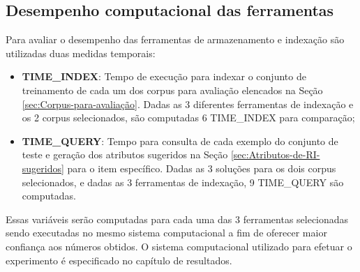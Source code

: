     \subsection{Desempenho computacional das ferramentas}  \label{subsec:Desempenho-computacional}
        Para avaliar o desempenho das ferramentas de armazenamento e indexação são utilizadas duas medidas temporais:
        \begin{itemize}
            \item \textbf{TIME\_INDEX}: Tempo de execução para indexar o conjunto de treinamento de cada um dos corpus para avaliação elencados na Seção \ref{sec:Corpus-para-avaliação}. Dadas as 3 diferentes ferramentas de indexação e os 2 corpus selecionados, são computadas 6 TIME\_INDEX para comparação;
            
            \item \textbf{TIME\_QUERY}: Tempo para consulta de cada exemplo do conjunto de teste e geração dos atributos sugeridos na Seção \ref{sec:Atributos-de-RI-sugeridos} para o item específico. Dadas as 3 soluções para os dois corpus selecionados, e dadas as 3 ferramentas de indexação, 9 TIME\_QUERY são computadas.  
        \end{itemize}
        
        Essas variáveis serão computadas para cada uma das 3 ferramentas selecionadas sendo executadas no mesmo sistema computacional a fim de oferecer maior confiança aos números obtidos. 
        O sistema computacional utilizado para efetuar o experimento é especificado no capítulo de resultados.
    

